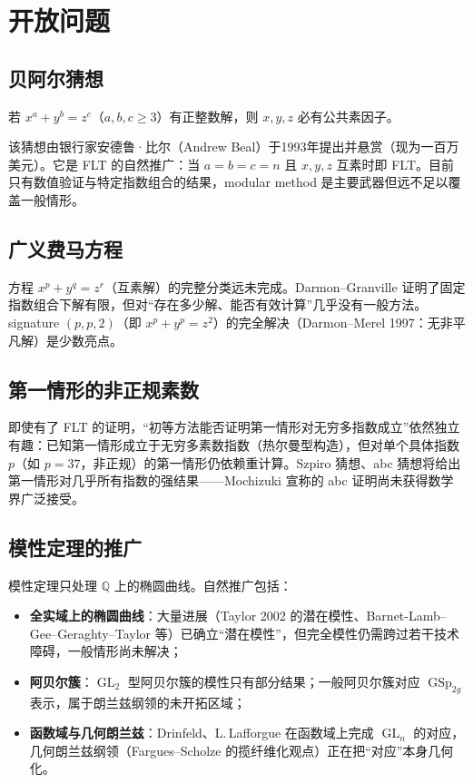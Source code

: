 \section{开放问题}\label{sec:open_problems}

\subsection{贝阿尔猜想}

\begin{conjecture}[Beal 猜想]
    若 $x^a + y^b = z^c$（$a, b, c \ge 3$）有正整数解，则 $x, y, z$ 必有公共素因子。
\end{conjecture}

该猜想由银行家安德鲁·比尔（Andrew Beal）于1993年提出并悬赏（现为一百万美元）。它是 FLT 的自然推广：当 $a = b = c = n$ 且 $x, y, z$ 互素时即 FLT。目前只有数值验证与特定指数组合的结果，modular method 是主要武器但远不足以覆盖一般情形。

\subsection{广义费马方程}

方程 $x^p + y^q = z^r$（互素解）的完整分类远未完成。Darmon--Granville 证明了固定指数组合下解有限，但对“存在多少解、能否有效计算”几乎没有一般方法。 signature $(p, p, 2)$（即 $x^p + y^p = z^2$）的完全解决（Darmon--Merel 1997：无非平凡解\cite{darmon1997winding}）是少数亮点。

\subsection{第一情形的非正规素数}

即使有了 FLT 的证明，“初等方法能否证明第一情形对无穷多指数成立”依然独立有趣：已知第一情形成立于无穷多素数指数（热尔曼型构造），但对单个具体指数 $p$（如 $p = 37$，非正规）的第一情形仍依赖重计算。Szpiro 猜想、abc 猜想将给出第一情形对几乎所有指数的强结果——Mochizuki 宣称的 abc 证明尚未获得数学界广泛接受。

\subsection{模性定理的推广}

模性定理只处理 $\mathbb{Q}$ 上的椭圆曲线。自然推广包括：

\begin{itemize}
    \item \textbf{全实域上的椭圆曲线}：大量进展（Taylor 2002 的潜在模性、Barnet-Lamb--Gee--Geraghty--Taylor 等）已确立“潜在模性”，但完全模性仍需跨过若干技术障碍，一般情形尚未解决；
    \item \textbf{阿贝尔簇}：$\operatorname{GL}_2$ 型阿贝尔簇的模性只有部分结果；一般阿贝尔簇对应 $\operatorname{GSp}_{2g}$ 表示，属于朗兰兹纲领的未开拓区域；
    \item \textbf{函数域与几何朗兰兹}：Drinfeld、L.\,Lafforgue 在函数域上完成 $\operatorname{GL}_n$ 的对应，几何朗兰兹纲领（Fargues--Scholze 的揽纤维化观点）正在把“对应”本身几何化。
\end{itemize}

